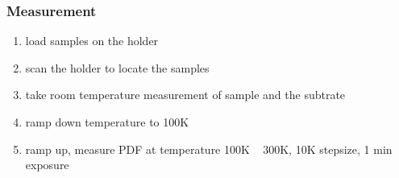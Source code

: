 \documentclass[prl,aps,tighten,amsmath,amssymb,floatfix]{revtex4-1}
\begin{document}
\subsubsection{Measurement}
\begin{enumerate}
\item load samples on the holder
\item scan the holder to locate the samples
\item take room temperature measurement of sample and the subtrate
\item ramp down temperature to 100K
\item ramp up, measure PDF at temperature 100K ~ 300K, 10K stepsize, 1 min exposure
\end{enumerate}
\end{document}
